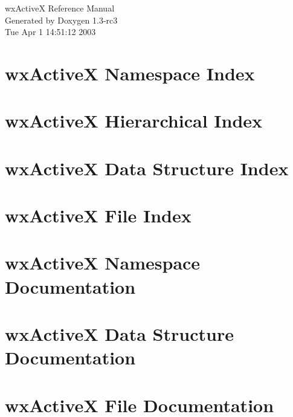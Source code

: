 \documentclass[a4paper]{book}
\begin{document}
\begin{titlepage}
\vspace*{7cm}
\begin{center}
{\Large wx\-Active\-X Reference Manual}\\
\vspace*{1cm}
{\large Generated by Doxygen 1.3-rc3}\\
\vspace*{0.5cm}
{\small Tue Apr 1 14:51:12 2003}\\
\end{center}
\end{titlepage}
\clearemptydoublepage
{}
\tableofcontents
\clearemptydoublepage
{}
\chapter{wx\-Active\-X Namespace Index}

\chapter{wx\-Active\-X Hierarchical Index}

\chapter{wx\-Active\-X Data Structure Index}

\chapter{wx\-Active\-X File Index}

\chapter{wx\-Active\-X Namespace Documentation}

\chapter{wx\-Active\-X Data Structure Documentation}






\chapter{wx\-Active\-X File Documentation}


\printindex
\end{document}
